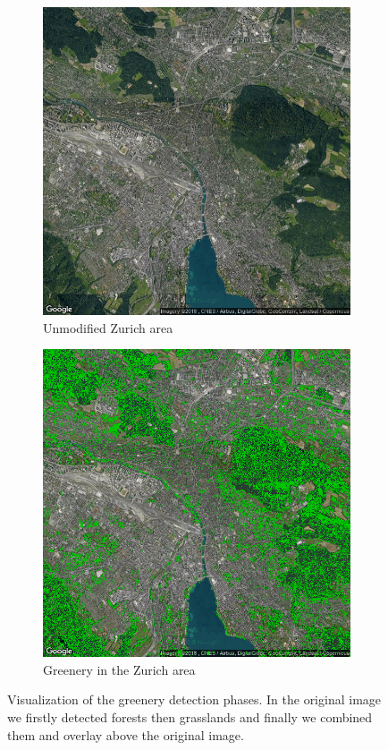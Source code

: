 \documentclass[letterpaper]{article}
\begin{document}
\begin{figure}
    \begin{subfigure}{.22\textwidth}
        \centering
        \includegraphics[width=.95\linewidth]{../images/greenery/Zurich.png}
        \caption[width=.2\textwidth]{Unmodified Zurich area}
    \end{subfigure}%
    \begin{subfigure}{.22\textwidth}
        \centering
        \includegraphics[width=.95\linewidth]{../images/greenery/Zurich_greenery.png}
        \caption[width=.2\textwidth]{Greenery in the Zurich area}
    \end{subfigure}
    \caption{Visualization of the greenery detection phases. In the original image we firstly detected forests then
             grasslands and finally we combined them and overlay above the original image.}
    \label{fig:ZurichGreenery}
\end{figure}
\end{document}
